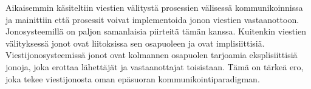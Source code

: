 Aikaisemmin käsiteltiin viestien välitystä prosessien välisessä kommunikoinnissa ja mainittiin että prosessit voivat implementoida jonon viestien vastaanottoon. Jonosysteemillä on paljon samanlaisia piirteitä tämän kanssa. Kuitenkin viestien välityksessä jonot ovat liitoksissa sen osapuoleen ja ovat implisiittisiä. Viestijonosysteemissä jonot ovat kolmannen osapuolen tarjoamia eksplisiittisiä jonoja, joka erottaa lähettäjät ja vastaanottajat toisistaan. Tämä on tärkeä ero, joka tekee viestijonosta oman epäsuoran kommunikointiparadigman. \mbox{\cite[s.~256]{distributed-systems-concepts-and-design}}

